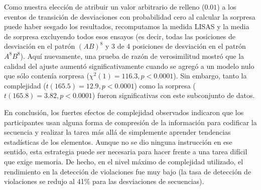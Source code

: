 Como nuestra elección de atribuir un valor arbitrario de relleno ($0.01$) a los eventos de transición de desviaciones con probabilidad cero al calcular la sorpresa puede haber sesgado los resultados, recomputamos la medida LISAS y la media de sorpresa excluyendo todos esos ensayos (es decir, todas las posiciones de desviación en el patrón $(AB)^8$ y 3 de 4 posiciones de desviación en el patrón $A^8 B^8$). Aquí nuevamente, una prueba de razón de verosimilitud mostró que la calidad del ajuste aumentó significativamente cuando se agregó \mdlbin a un modelo nulo que sólo contenía sorpresa ($\chi^2(1) = 116.3, p < 0.0001$). Sin embargo, tanto la complejidad ($t (165.5) = 12.9, p < 0.0001$) como la sorpresa ($t(165.8) = 3.82, p < 0.0001$) fueron significativas con este subconjunto de datos. 


En conclusión, los fuertes efectos de complejidad observados indicaron que los participantes usan alguna forma de compresión de la información para codificar la secuencia y realizar la tarea más allá de simplemente aprender tendencias estadísticas de los elementos. Aunque no se dio ninguna instrucción en ese sentido, esta estrategia puede ser necesaria para hacer frente a una tarea difícil que exige memoria. De hecho, en el nivel máximo de complejidad utilizado, el rendimiento en la detección de violaciones fue muy bajo (la tasa de detección de violaciones se redujo al 41\% para las desviaciones de secuencias).


